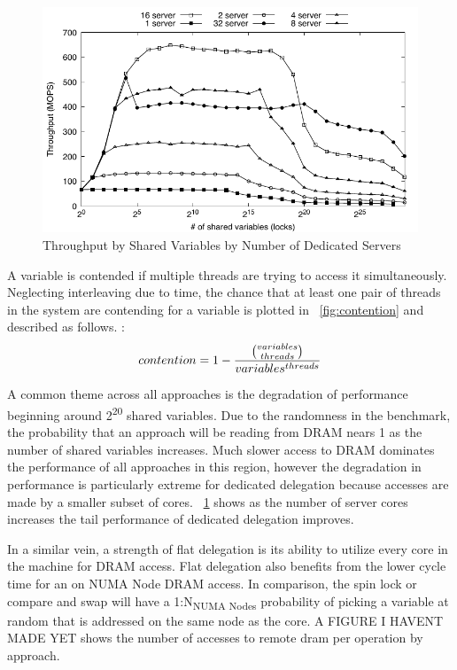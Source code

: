 \documentclass{uicthesi}
\begin{document}
\begin{figure}[ht!]
\centering
\includegraphics[width=0.9\columnwidth]{FIG/fetch_add_dedicated_vary_server.pdf}
\caption{Throughput by Shared Variables by Number of Dedicated Servers}
\label{fig:vary_server}
\end{figure}

A variable is contended if multiple threads are trying to access it simultaneously. Neglecting interleaving due to time, the chance that at least one pair of threads in the system are contending for a variable is plotted in ~\ref{fig:contention} and described as follows. : 
\begin{displaymath}
contention = 1 - {{ variables \choose threads }  \over  variables^{threads}}
\end{displaymath}

A common theme across all approaches is the degradation of performance beginning around 2\textsuperscript{20} shared variables. Due to the randomness in the benchmark, the probability that an approach will be reading from DRAM nears 1 as the number of shared variables increases. Much slower access to DRAM dominates the performance of all approaches in this region, however the degradation in performance is particularly extreme for dedicated delegation because accesses are made by a smaller subset of cores. ~\ref{fig:vary_server} shows as the number of server cores increases the tail performance of dedicated delegation improves. 


In a similar vein, a strength of flat delegation is its ability to utilize every core in the machine for DRAM access. Flat delegation also benefits from the lower cycle time for an on NUMA Node DRAM access. In comparison, the spin lock or compare and swap will have a 1:N\textsubscript{NUMA Nodes} probability of picking a variable at random that is addressed on the same node as the core. A FIGURE I HAVENT MADE YET shows the number of accesses to remote dram per operation by approach. 
\end{document}

